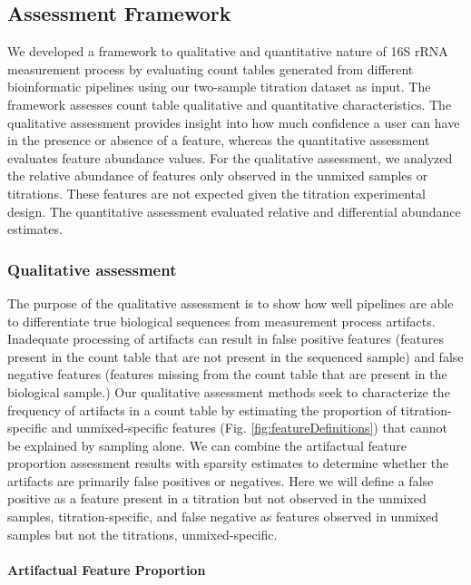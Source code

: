 \documentclass[linenumbers]{bmcart}
\begin{document}
\subsection*{Assessment Framework}
We developed a framework to qualitative and quantitative nature of 16S rRNA
measurement process by evaluating count tables generated from different bioinformatic pipelines using our two-sample titration dataset as input.
The framework assesses count table qualitative and quantitative characteristics.
The qualitative assessment provides insight into how much confidence a user can have in the presence or absence of a feature, whereas the quantitative assessment evaluates feature abundance values. For the qualitative assessment, we analyzed the relative abundance of features
only observed in the unmixed samples or titrations. These features are
not expected given the titration experimental design. The quantitative
assessment evaluated relative and differential abundance estimates.


\subsubsection*{Qualitative assessment}
The purpose of the qualitative assessment is to show how well pipelines are able to differentiate true biological sequences from measurement process artifacts.
Inadequate processing of artifacts can result in false positive features (features present in the count table that are not present in the sequenced sample) and false negative features (features missing from the count table that are present in the biological sample.)
Our qualitative assessment methods seek to characterize the frequency of artifacts in a count table by estimating the proportion of titration-specific and unmixed-specific features (Fig. \ref{fig:featureDefinitions}) that cannot be explained by sampling alone.
We can combine the artifactual feature proportion assessment results with sparsity estimates to determine whether the artifacts are primarily false positives or negatives.
Here we will define a false positive as a feature present in a titration but not observed in the unmixed samples, titration-specific, and false negative as features observed in unmixed samples but not the titrations, unmixed-specific.

\paragraph{Artifactual Feature Proportion}
\end{document}
